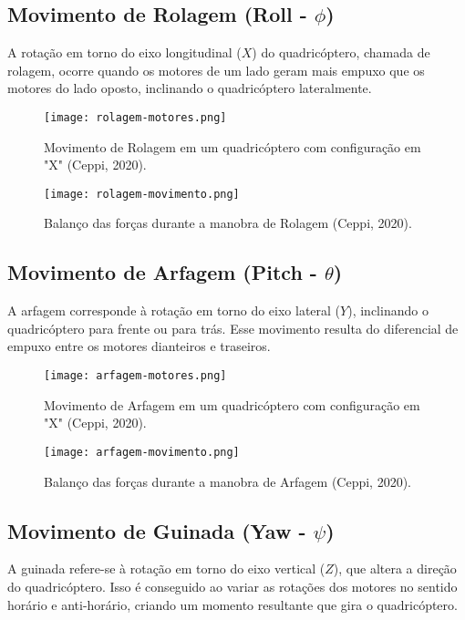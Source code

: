 \subsection{Movimento de Rolagem (Roll - $\phi$)}
A rotação em torno do eixo longitudinal ($X$) do quadricóptero, chamada de rolagem, ocorre quando os motores de um lado geram mais empuxo que os motores do lado oposto, inclinando o quadricóptero lateralmente.

\begin{figure}[H]
	\centering
	\texttt{[image: rolagem-motores.png]}
	\caption{Movimento de Rolagem em um quadricóptero com configuração em "X" (Ceppi, 2020).}
	\label{fig:roll_maneuver}
\end{figure}

\begin{figure}[H]
	\centering
	\texttt{[image: rolagem-movimento.png]} %
	\caption{Balanço das forças durante a manobra de Rolagem (Ceppi, 2020).}
	\label{fig:roll_maneuver_forces}
\end{figure}



\subsection{Movimento de Arfagem (Pitch - $\theta$)}
A arfagem corresponde à rotação em torno do eixo lateral ($Y$), inclinando o quadricóptero para frente ou para trás. Esse movimento resulta do diferencial de empuxo entre os motores dianteiros e traseiros.

\begin{figure}[H]
	\centering
	\texttt{[image: arfagem-motores.png]}
	\caption{Movimento de Arfagem em um quadricóptero com configuração em "X" (Ceppi, 2020).}
	\label{fig:pitch_maneuver}
\end{figure}

\begin{figure}[H]
	\centering
	\texttt{[image: arfagem-movimento.png]} %
	\caption{Balanço das forças durante a manobra de Arfagem (Ceppi, 2020).}
	\label{fig:pitch_maneuver_forces}
\end{figure}



\subsection{Movimento de Guinada (Yaw - $\psi$)}
A guinada refere-se à rotação em torno do eixo vertical ($Z$), que altera a direção do quadricóptero. Isso é conseguido ao variar as rotações dos motores no sentido horário e anti-horário, criando um momento resultante que gira o quadricóptero.

